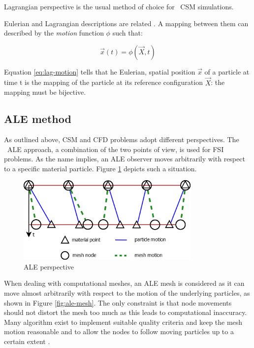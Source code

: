 Lagrangian perspective is the usual method of choice for ~\ac{CSM} simulations.

Eulerian and Lagrangian descriptions are related \cite{bertram2012elasticity}. A mapping between them can described by the \textit{motion} function $\phi$ such that:


\begin{equation}
\vec{x}(t) = \phi(\vec{X}, t)
\label{eq:lag-motion}
\end{equation}

Equation \ref{eq:lag-motion} tells that he Eulerian, spatial position $\vec{x}$ of a particle at time t is the
mapping of the particle at its reference configuration $\vec{X}$: the mapping must be bijective.

\subsection{ALE method}
\label{subsec:ALE}

As outlined above, CSM and CFD problems adopt different perspectives. The ~\ac{ALE} approach, a combination of the two points of view, is used for FSI problems. As the name implies, an ALE observer moves arbitrarily with respect to a specific material particle.
Figure \ref{fig:ale} depicts such a situation.

\begin{figure}[htbp!]
	\centering
	\includegraphics[width=0.8\textwidth]{images/ale}
	\caption{ALE perspective}
	\label{fig:ale}
\end{figure}

When dealing with computational meshes, an ALE mesh is considered as it can move almost arbitrarily with respect to the motion of the underlying particles, as shown in Figure \ref{fig:ale-mesh}.
The only constraint is that node movements should not distort the mesh too much as this leads to computational inaccuracy. Many algorithm exist to implement suitable quality criteria and keep the mesh motion reasonable and to allow the nodes to follow moving particles up to a certain extent \cite{de2007mesh}.

